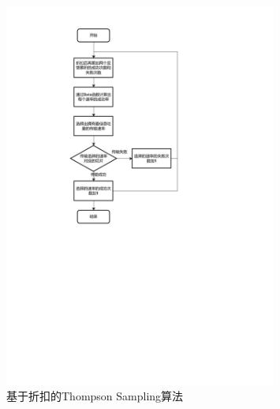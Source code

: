 \begin{figure}[h]
	\centering
	\includegraphics[width=0.8\textwidth]{figure/折扣流程图.pdf}
	\caption{基于折扣的Thompson Sampling算法}
	\label{折扣流程图}
\end{figure}

